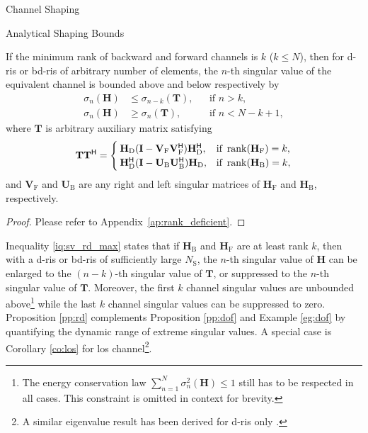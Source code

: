 \documentclass[journal]{IEEEtran}
\begin{document}
\begin{section}{Channel Shaping}
\begin{subsection}{Analytical Shaping Bounds}
		\begin{proposition}
			\label{pp:rd}
			If the minimum rank of backward and forward channels is $k$ ($k \le N$),
			then for \gls{d}-\gls{ris} or \gls{bd}-\gls{ris} of arbitrary number of elements, the $n$-th singular value of the equivalent channel is bounded above and below respectively by
			\begin{subequations}
				\label{iq:sv_rd}
				\begin{align}
					\sigma_n(\mathbf{H}) & \le \sigma_{n-k}(\mathbf{T}), &  & \text{if } n > k, \label{iq:sv_rd_max}          \\
					\sigma_n(\mathbf{H}) & \ge \sigma_n(\mathbf{T}),     &  & \text{if } n < N - k + 1, \label{iq:sv_rd_min}
				\end{align}
			\end{subequations}
			where $\mathbf{T}$ is arbitrary auxiliary matrix satisfying
			\begin{equation}
				\label{eq:auxiliary_rd}
				\mathbf{T} \mathbf{T}^\mathsf{H} =
				\begin{cases}
					\mathbf{H}_\mathrm{D} (\mathbf{I} - \mathbf{V}_\mathrm{F} \mathbf{V}_\mathrm{F}^\mathsf{H}) \mathbf{H}_\mathrm{D}^\mathsf{H}, & \text{if } \operatorname{rank}(\mathbf{H}_\mathrm{F}) = k, \\
					\mathbf{H}_\mathrm{D}^\mathsf{H} (\mathbf{I} - \mathbf{U}_\mathrm{B} \mathbf{U}_\mathrm{B}^\mathsf{H}) \mathbf{H}_\mathrm{D}, & \text{if } \operatorname{rank}(\mathbf{H}_\mathrm{B}) = k,
				\end{cases}
			\end{equation}
			and $\mathbf{V}_\mathrm{F}$ and $\mathbf{U}_\mathrm{B}$ are any right and left singular matrices of $\mathbf{H}_\mathrm{F}$ and $\mathbf{H}_\mathrm{B}$, respectively.
		\end{proposition}
		\begin{proof}
			Please refer to Appendix~\ref{ap:rank_deficient}.
		\end{proof}

		Inequality \eqref{iq:sv_rd_max} states that
		if $\mathbf{H}_\mathrm{B}$ and $\mathbf{H}_\mathrm{F}$ are at least rank $k$, then
		with a \gls{d}-\gls{ris} or \gls{bd}-\gls{ris} of sufficiently large $N_\mathrm{S}$,
		the $n$-th singular value of $\mathbf{H}$ can be enlarged to the $(n-k)$-th singular value of $\mathbf{T}$, or suppressed to the $n$-th singular value of $\mathbf{T}$.
		Moreover, the first $k$ channel singular values are unbounded above\footnote{The energy conservation law $\sum_{n=1}^N \sigma_n^2(\mathbf{H}) \le 1$ still has to be respected in all cases. This constraint is omitted in context for brevity.} while the last $k$ channel singular values can be suppressed to zero.
		Proposition \ref{pp:rd} complements Proposition \ref{pp:dof} and Example \ref{eg:dof} by quantifying the dynamic range of extreme singular values.
		A special case is Corollary \ref{co:los} for \gls{los} channel\footnote{A similar eigenvalue result has been derived for \gls{d}-\gls{ris} only \cite{Semmler2023}.}.



\end{subsection}
\end{section}
\end{document}
